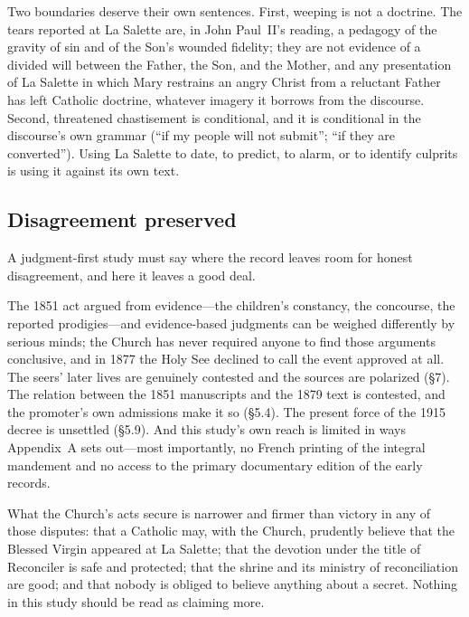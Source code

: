 Two boundaries deserve their own sentences. First, weeping is not a
doctrine. The tears reported at La Salette are, in John Paul~II's
reading, a pedagogy of the gravity of sin and of the Son's wounded
fidelity; they are not evidence of a divided will between the Father,
the Son, and the Mother, and any presentation of La Salette in which
Mary restrains an angry Christ from a reluctant Father has left
Catholic doctrine, whatever imagery it borrows from the discourse.
Second, threatened chastisement is conditional, and it is
conditional in the discourse's own grammar (``if my people will not
submit''; ``if they are converted''). Using La Salette to date, to
predict, to alarm, or to identify culprits is using it against its
own text.

\subsection{Disagreement preserved}

A judgment-first study must say where the record leaves room for
honest disagreement, and here it leaves a good deal.

The 1851 act argued from evidence---the children's constancy, the
concourse, the reported prodigies---and evidence-based judgments can
be weighed differently by serious minds; the Church has never
required anyone to find those arguments conclusive, and in 1877 the
Holy See declined to call the event approved at all. The seers'
later lives are genuinely contested and the sources are polarized
(\S7). The relation between the 1851 manuscripts and the 1879 text
is contested, and the promoter's own admissions make it so (\S5.4).
The present force of the 1915 decree is unsettled (\S5.9). And this
study's own reach is limited in ways Appendix~A sets out---most
importantly, no French printing of the integral mandement and no
access to the primary documentary edition of the early records.

What the Church's acts secure is narrower and firmer than victory in
any of those disputes: that a Catholic may, with the Church,
prudently believe that the Blessed Virgin appeared at La Salette;
that the devotion under the title of Reconciler is safe and
protected; that the shrine and its ministry of reconciliation are
good; and that nobody is obliged to believe anything about a secret.
Nothing in this study should be read as claiming more.
